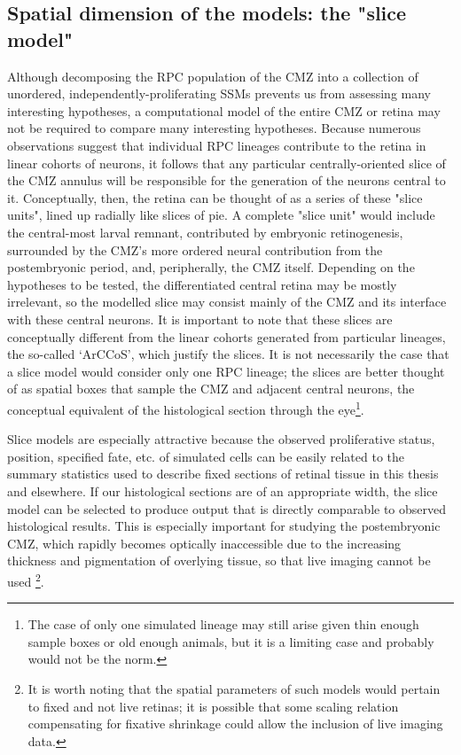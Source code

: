 \subsection{Spatial dimension of the models: the "slice model"}
Although decomposing the RPC population of the CMZ into a collection of unordered, independently-proliferating SSMs prevents us from assessing many interesting hypotheses, a computational model of the entire CMZ or retina may not be required to compare many interesting hypotheses. Because numerous observations suggest that individual RPC lineages contribute to the retina in linear cohorts of neurons, it follows that any particular centrally-oriented slice of the CMZ annulus will be responsible for the generation of the neurons central to it. Conceptually, then, the retina can be thought of as a series of these "slice units", lined up radially like slices of pie. A complete "slice unit" would include the central-most larval remnant, contributed by embryonic retinogenesis, surrounded by the CMZ's more ordered neural contribution from the postembryonic period, and, peripherally, the CMZ itself. Depending on the hypotheses to be tested, the differentiated central retina may be mostly irrelevant, so the modelled slice may consist mainly of the CMZ and its interface with these central neurons. It is important to note that these slices are conceptually different from the linear cohorts generated from particular lineages, the so-called `ArCCoS', which justify the slices. It is not necessarily the case that a slice model would consider only one RPC lineage; the slices are better thought of as spatial boxes that sample the CMZ and adjacent central neurons, the conceptual equivalent of the histological section through the eye\footnote{The case of only one simulated lineage may still arise given thin enough sample boxes or old enough animals, but it is a limiting case and probably would not be the norm.}.

Slice models are especially attractive because the observed proliferative status, position, specified fate, etc. of simulated cells can be easily related to the summary statistics used to describe fixed sections of retinal tissue in this thesis and elsewhere. If our histological sections are of an appropriate width, the slice model can be selected to produce output that is directly comparable to observed histological results. This is especially important for studying the postembryonic CMZ, which rapidly becomes optically inaccessible due to the increasing thickness and pigmentation of overlying tissue, so that live imaging cannot be used \footnote{It is worth noting that the spatial parameters of such models would pertain to fixed and not live retinas; it is possible that some scaling relation compensating for fixative shrinkage could allow the inclusion of live imaging data.}.

